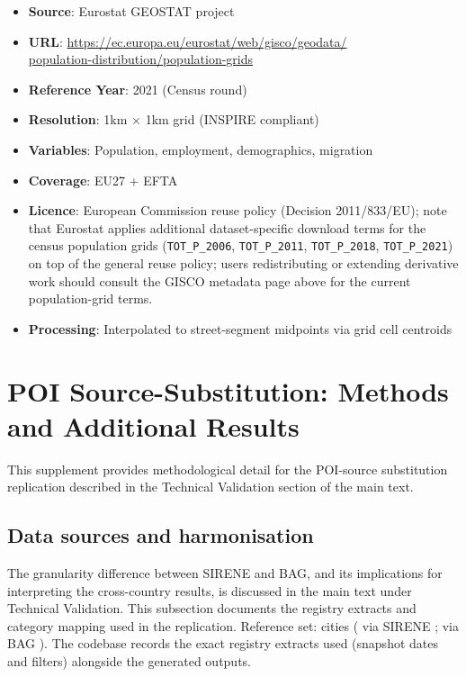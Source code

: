 \begin{itemize}
  \item \textbf{Source}: Eurostat GEOSTAT project
  \item \textbf{URL}: \url{https://ec.europa.eu/eurostat/web/gisco/geodata/}\\\url{population-distribution/population-grids}
  \item \textbf{Reference Year}: 2021 (Census round)
  \item \textbf{Resolution}: 1km $\times$ 1km grid (INSPIRE compliant)
  \item \textbf{Variables}: Population, employment, demographics, migration
  \item \textbf{Coverage}: EU27 + EFTA
  \item \textbf{Licence}: European Commission reuse policy (Decision 2011/833/EU); note that Eurostat applies additional dataset-specific download terms for the census population grids (\texttt{TOT\_P\_2006}, \texttt{TOT\_P\_2011}, \texttt{TOT\_P\_2018}, \texttt{TOT\_P\_2021}) on top of the general reuse policy; users redistributing or extending derivative work should consult the GISCO metadata page above for the current population-grid terms.
  \item \textbf{Processing}: Interpolated to street-segment midpoints via grid cell centroids
\end{itemize}

\section{POI Source-Substitution: Methods and Additional Results}
\label{sec:poi-supp}

This supplement provides methodological detail for the POI-source substitution replication described in the Technical Validation section of the main text.

\subsection{Data sources and harmonisation}
\label{sec:poi-supp-data}

The granularity difference between SIRENE and BAG, and its implications for interpreting the cross-country results, is discussed in the main text under Technical Validation. This subsection documents the registry extracts and category mapping used in the replication. Reference set: \NRefCities{} cities (\NRefCitiesFr{} via SIRENE \cite{sirene2026}; \NRefCitiesNl{} via BAG \cite{bag2026}). The codebase records the exact registry extracts used (snapshot dates and filters) alongside the generated outputs.

